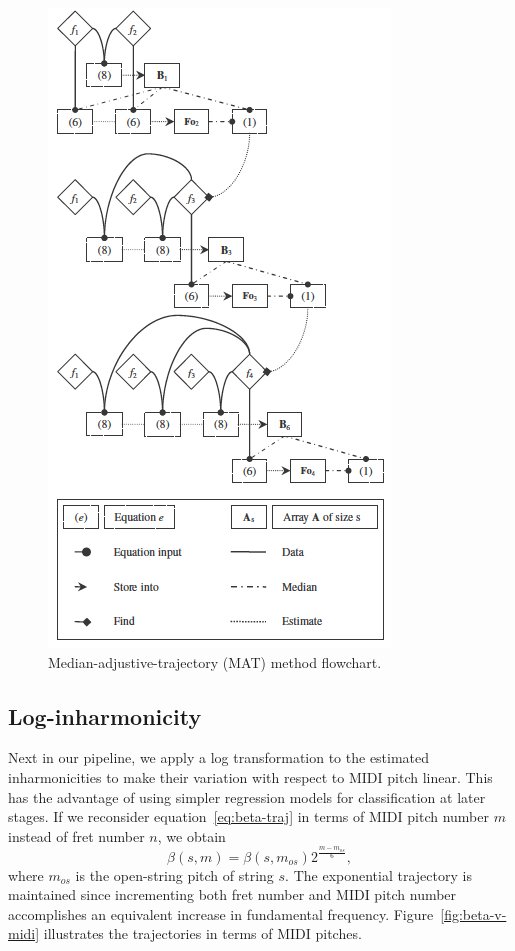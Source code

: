 \documentclass[12pt]{cmuthesis}
\begin{document}
\begin{figure}[!htbp] 
\label{fig:mat-flowchart}
\centering
\includegraphics[scale=0.9]{mat-flowchart}
\caption{Median-adjustive-trajectory (MAT) method flowchart.}
\end{figure}

\subsection{Log-inharmonicity}
Next in our pipeline, we apply a log transformation to the estimated inharmonicities to make their variation with respect to MIDI pitch linear. This has the advantage of using simpler regression models for classification at later stages. If we reconsider equation~\eqref{eq:beta-traj} in terms of MIDI pitch number $m$ instead of fret number $n$, we obtain
\begin{equation}
\beta(s,m) = \beta(s,m_{os})2^{\frac{m-m_{os}}{6}},
\end{equation}
where $m_{os}$ is the open-string pitch of string $s$. The exponential trajectory is maintained since incrementing both fret number and MIDI pitch number accomplishes an equivalent increase in fundamental frequency. Figure~\ref{fig:beta-v-midi} illustrates the trajectories in terms of MIDI pitches.
\end{document}
